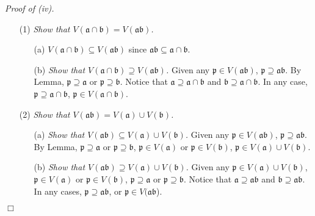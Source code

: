 \documentclass{article}
\begin{document}
\emph{Proof of (iv).}
\begin{enumerate}
\item[(1)]
\emph{Show that $V(\mathfrak{a} \cap \mathfrak{b}) = V(\mathfrak{a} \mathfrak{b})$.}
  \begin{enumerate}
  \item[(a)]
    \emph{$V(\mathfrak{a} \cap \mathfrak{b}) \subseteq V(\mathfrak{a} \mathfrak{b})$}
    since $\mathfrak{a} \mathfrak{b} \subseteq \mathfrak{a} \cap \mathfrak{b}$.

  \item[(b)]
    \emph{Show that $V(\mathfrak{a} \cap \mathfrak{b}) \supseteq V(\mathfrak{a} \mathfrak{b})$.}
    Given any $\mathfrak{p} \in V(\mathfrak{a} \mathfrak{b})$,
    $\mathfrak{p} \supseteq \mathfrak{a} \mathfrak{b}$.
    By Lemma, $\mathfrak{p} \supseteq \mathfrak{a}$ or $\mathfrak{p} \supseteq \mathfrak{b}$.
    Notice that $\mathfrak{a} \supseteq \mathfrak{a \cap b}$
    and $\mathfrak{b} \supseteq \mathfrak{a \cap b}$.
    In any case, $\mathfrak{p} \supseteq \mathfrak{a \cap b}$,
    $\mathfrak{p} \in V(\mathfrak{a} \cap \mathfrak{b})$.
  \end{enumerate}

\item[(2)]
\emph{Show that $V(\mathfrak{a} \mathfrak{b}) = V(\mathfrak{a}) \cup V(\mathfrak{b})$.}
  \begin{enumerate}
  \item[(a)]
    \emph{Show that $V(\mathfrak{a} \mathfrak{b})
    \subseteq V(\mathfrak{a}) \cup V(\mathfrak{b})$.}
    Given any $\mathfrak{p} \in V(\mathfrak{a} \mathfrak{b})$,
    $\mathfrak{p} \supseteq \mathfrak{a} \mathfrak{b}$.
    By Lemma,
    $\mathfrak{p} \supseteq \mathfrak{a}$ or $\mathfrak{p} \supseteq \mathfrak{b}$,
    $\mathfrak{p} \in V(\mathfrak{a})$ or $\mathfrak{p} \in V(\mathfrak{b})$,
    $\mathfrak{p} \in V(\mathfrak{a}) \cup V(\mathfrak{b})$.
  
  \item[(b)]
    \emph{Show that $V(\mathfrak{a} \mathfrak{b})
    \supseteq V(\mathfrak{a}) \cup V(\mathfrak{b})$.}
    Given any $\mathfrak{p} \in V(\mathfrak{a}) \cup V(\mathfrak{b})$,
    $\mathfrak{p} \in V(\mathfrak{a})$ or $\mathfrak{p} \in V(\mathfrak{b})$,
    $\mathfrak{p} \supseteq \mathfrak{a}$ or $\mathfrak{p} \supseteq \mathfrak{b}$.
    Notice that $\mathfrak{a} \supseteq \mathfrak{ab}$
    and $\mathfrak{b} \supseteq \mathfrak{ab}$.
    In any cases, $\mathfrak{p} \supseteq \mathfrak{ab}$,
    or $\mathfrak{p} \in V(\mathfrak{ab}$).
  \end{enumerate}
\end{enumerate}
$\Box$ \\\\
\end{document}
